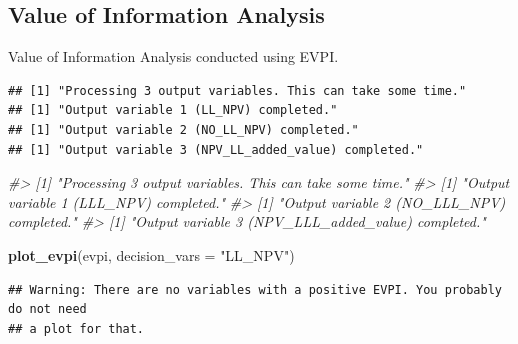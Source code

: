 \documentclass[
]{article}
\newenvironment{Shaded}{\begin{snugshade}}{\end{snugshade}}
\newcommand{\AttributeTok}[1]{\textcolor[rgb]{0.13,0.29,0.53}{#1}}
\newcommand{\CommentTok}[1]{\textcolor[rgb]{0.56,0.35,0.01}{\textit{#1}}}
\newcommand{\DecValTok}[1]{\textcolor[rgb]{0.00,0.00,0.81}{#1}}
\newcommand{\FunctionTok}[1]{\textcolor[rgb]{0.13,0.29,0.53}{\textbf{#1}}}
\newcommand{\NormalTok}[1]{#1}
\newcommand{\OtherTok}[1]{\textcolor[rgb]{0.56,0.35,0.01}{#1}}
\newcommand{\SpecialCharTok}[1]{\textcolor[rgb]{0.81,0.36,0.00}{\textbf{#1}}}
\newcommand{\StringTok}[1]{\textcolor[rgb]{0.31,0.60,0.02}{#1}}
\begin{document}
\hypertarget{value-of-information-analysis}{%
\subsection{Value of Information
Analysis}\label{value-of-information-analysis}}

Value of Information Analysis conducted using EVPI.

\begin{Shaded}
\end{Shaded}

\begin{verbatim}
## [1] "Processing 3 output variables. This can take some time."
## [1] "Output variable 1 (LL_NPV) completed."
## [1] "Output variable 2 (NO_LL_NPV) completed."
## [1] "Output variable 3 (NPV_LL_added_value) completed."
\end{verbatim}

\begin{Shaded}
\begin{Highlighting}[]
\CommentTok{\#\textgreater{} [1] "Processing 3 output variables. This can take some time."}
\CommentTok{\#\textgreater{} [1] "Output variable 1 (LLL\_NPV) completed."}
\CommentTok{\#\textgreater{} [1] "Output variable 2 (NO\_LLL\_NPV) completed."}
\CommentTok{\#\textgreater{} [1] "Output variable 3 (NPV\_LLL\_added\_value) completed."}

\FunctionTok{plot\_evpi}\NormalTok{(evpi, }\AttributeTok{decision\_vars =} \StringTok{"LL\_NPV"}\NormalTok{)}
\end{Highlighting}
\end{Shaded}

\begin{verbatim}
## Warning: There are no variables with a positive EVPI. You probably do not need
## a plot for that.
\end{verbatim}
\end{document}
